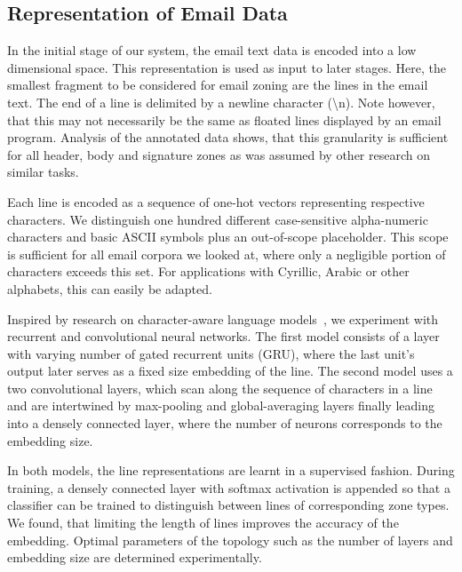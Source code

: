 \documentclass{llncs}
\begin{document}
\subsection{Representation of Email Data}
In the initial stage of our system, the email text data is encoded into a low dimensional space.
This representation is used as input to later stages.
Here, the smallest fragment to be considered for email zoning are the lines in the email text.
The end of a line is delimited by a newline character (\textbackslash n).
Note however, that this may not necessarily be the same as floated lines displayed by an email program.
Analysis of the annotated data shows, that this granularity is sufficient for all header, body and signature zones as was assumed by other research on similar tasks.

Each line is encoded as a sequence of one-hot vectors representing respective characters.
We distinguish one hundred different case-sensitive alpha-numeric characters and basic ASCII symbols plus an out-of-scope placeholder.
This scope is sufficient for all email corpora we looked at, where only a negligible portion of characters exceeds this set.
For applications with Cyrillic, Arabic or other alphabets, this can easily be adapted.

Inspired by research on character-aware language models~\cite{char_nn}, we experiment with recurrent and convolutional neural networks.
The first model consists of a layer with varying number of gated recurrent units (GRU), where the last unit's output later serves as a fixed size embedding of the line.
The second model uses a two convolutional layers, which scan along the sequence of characters in a line and are intertwined by max-pooling and global-averaging layers finally leading into a densely connected layer, where the number of neurons corresponds to the embedding size.

In both models, the line representations are learnt in a supervised fashion.
During training, a densely connected layer with softmax activation is appended so that a classifier can be trained to distinguish between lines of corresponding zone types.
We found, that limiting the length of lines improves the accuracy of the embedding.
Optimal parameters of the topology such as the number of layers and embedding size are determined experimentally.


\end{document}

